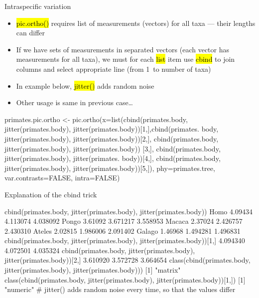\documentclass[compress, ucs, xelatex, 11pt, xcolor=svgnames,
  hyperref={
    bookmarks=true,
    unicode=true,
    colorlinks=true,
    pdftitle={Molecular data in R},
    plainpages=false,
    pdfauthor={Vojtech Zeisek},
    pdfsubject={Course about phylogeny and evolution in R},
    pdfcreator={XeLaTeX},
    pdfkeywords={R, evolution, phylogeny, molecular data},
    linkcolor=Tomato,
    anchorcolor=SaddleBrown,
    citecolor=Goldenrod,
    filecolor=DarkMagenta,
    menucolor=Sienna,
    urlcolor=DarkTurquoise,
    pdftex},
  url={hyphens, lowtilde} %
  ]{beamer}
\renewcommand{\texttt}[1]{\hl{\ttfamily #1}}
\begin{document}
\begin{frame}[fragile]{Intraspecific variation}
  \begin{itemize}
    \item \texttt{pic.ortho()} requires list of measurements (vectors) for all taxa --- their lengths can differ
    \item If we have sets of measurements in separated vectors (each vector has measurements for all taxa), we must for each \texttt{list} item use \texttt{cbind} to join columns and select appropriate line (from 1~to number of taxa)
    \item In example below, \texttt{jitter()} adds random noise
    \item Other usage is same in previous case\ldots
  \end{itemize}
  \begin{spluscode}
    primates.pic.ortho <- pic.ortho(x=list(cbind(primates.body,
      jitter(primates.body), jitter(primates.body))[1,],cbind(primates.
      body, jitter(primates.body), jitter(primates.body))[2,],
      cbind(primates.body, jitter(primates.body), jitter(primates.body))
      [3,], cbind(primates.body, jitter(primates.body), jitter(primates.
      body))[4,], cbind(primates.body, jitter(primates.body), 
      jitter(primates.body))[5,]), phy=primates.tree, var.contrasts=FALSE,
      intra=FALSE)
  \end{spluscode}
\end{frame}

\begin{frame}[fragile]{Explanation of the cbind trick}
  \begin{spluscode}
    cbind(primates.body, jitter(primates.body), jitter(primates.body))
    Homo         4.09434 4.113074 4.038092
    Pongo        3.61092 3.671217 3.558953
    Macaca       2.37024 2.426757 2.430310
    Ateles       2.02815 1.986006 2.091402
    Galago       1.46968 1.494281 1.496831
    cbind(primates.body, jitter(primates.body), jitter(primates.body))[1,]
      4.094340      4.072501      4.035324 
    cbind(primates.body, jitter(primates.body), jitter(primates.body))[2,]
      3.610920      3.572728      3.664654 
    class(cbind(primates.body, jitter(primates.body),
      jitter(primates.body)))
    [1] "matrix"
    class(cbind(primates.body, jitter(primates.body),
      jitter(primates.body))[1,])
    [1] "numeric"
    # jitter() adds random noise every time, so that the values differ
  \end{spluscode}
\end{frame}
\end{document}

